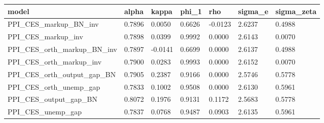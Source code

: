 \begin{tabular}{lllllll}
\toprule
model & alpha & kappa & phi_1 & rho & sigma_e & sigma_zeta \\
\midrule
PPI_CES_markup_BN_inv & 0.7896 & 0.0050 & 0.6626 & -0.0123 & 2.6237 & 0.4988 \\
PPI_CES_markup_inv & 0.7898 & 0.0399 & 0.9992 & 0.0000 & 2.6143 & 0.0070 \\
PPI_CES_orth_markup_BN_inv & 0.7897 & -0.0141 & 0.6699 & 0.0000 & 2.6137 & 0.4988 \\
PPI_CES_orth_markup_inv & 0.7900 & 0.0283 & 0.9993 & 0.0000 & 2.6152 & 0.0070 \\
PPI_CES_orth_output_gap_BN & 0.7905 & 0.2387 & 0.9166 & 0.0000 & 2.5746 & 0.5778 \\
PPI_CES_orth_unemp_gap & 0.7833 & 0.1002 & 0.9508 & 0.0000 & 2.6130 & 0.5961 \\
PPI_CES_output_gap_BN & 0.8072 & 0.1976 & 0.9131 & 0.1172 & 2.5683 & 0.5778 \\
PPI_CES_unemp_gap & 0.7837 & 0.0768 & 0.9487 & 0.0903 & 2.6135 & 0.5961 \\
\bottomrule
\end{tabular}
